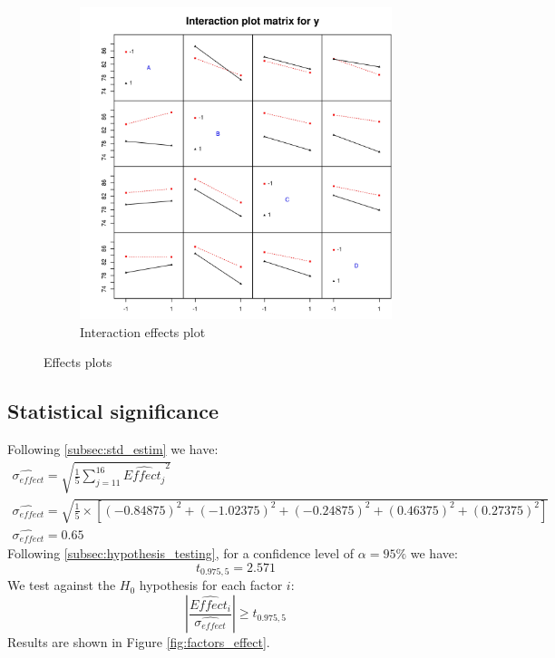 \documentclass{article}
\begin{document}
\begin{figure}[!ht]
\begin{subfigure}{0.49\textwidth}
        \includegraphics[width=\textwidth]{interaction_effects_plot.jpeg}
        \caption{Interaction effects plot}
        \label{fig:interaction_effects_plot}
    \end{subfigure}
    \caption{Effects plots}
    \label{fig:effects_plots}
\end{figure}

\subsection{Statistical significance}
\label{subsec:statistical_significance}

Following \ref{subsec:std_estim} we have:
\begin{gather}
    \widehat{\sigma_{effect}} = \sqrt{\frac{1}{5} \sum_{j=11}^{16} \widehat{Effect_j}^2} \\
    \widehat{\sigma_{effect}} = \sqrt{\frac{1}{5}\times\left[
            \left(-0.84875\right)^2
            + \left(-1.02375\right)^2
            + \left(-0.24875\right)^2
            + \left(0.46375\right)^2
            + \left(0.27375\right)^2
            \right]}                                                                             \\
    \widehat{\sigma_{effect}} = 0.65
\end{gather}
Following \ref{subsec:hypothesis_testing}, for a confidence level of $\alpha=95\%$ we have:
\begin{equation}
    t_{0.975, 5} = 2.571
\end{equation}
We test against the $H_0$ hypothesis for each factor $i$:
\begin{equation}
    \left| \frac{\widehat{Effect_i}}{\widehat{\sigma_{effect}}} \right| \geq t_{0.975, 5}
\end{equation}
Results are shown in Figure \ref{fig:factors_effect}.
\end{document}
